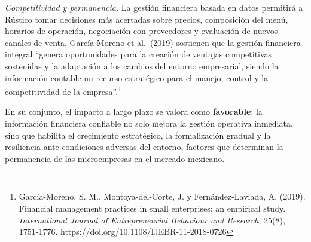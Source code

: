\documentclass[
  12pt,
  spanish,
]{article}
\begin{document}
\emph{Competitividad y permanencia.} La gestión financiera basada en
datos permitirá a Rústico tomar decisiones más acertadas sobre precios,
composición del menú, horarios de operación, negociación con proveedores
y evaluación de nuevos canales de venta. García-Moreno et al.~(2019)
sostienen que la gestión financiera integral ``genera oportunidades para
la creación de ventajas competitivas sostenidas y la adaptación a los
cambios del entorno empresarial, siendo la información contable un
recurso estratégico para el manejo, control y la competitividad de la
empresa''.\footnote{García-Moreno, S. M., Montoya-del-Corte, J. y
  Fernández-Laviada, A. (2019). Financial management practices in small
  enterprises: an empirical study. \emph{International Journal of
  Entrepreneurial Behaviour and Research}, 25(8), 1751-1776.
  https://doi.org/10.1108/IJEBR-11-2018-0726}

En su conjunto, el impacto a largo plazo se valora como
\textbf{favorable}: la información financiera confiable no solo mejora
la gestión operativa inmediata, sino que habilita el crecimiento
estratégico, la formalización gradual y la resiliencia ante condiciones
adversas del entorno, factores que determinan la permanencia de las
microempresas en el mercado mexicano.

\begin{center}\rule{0.5\linewidth}{0.5pt}\end{center}
\end{document}
